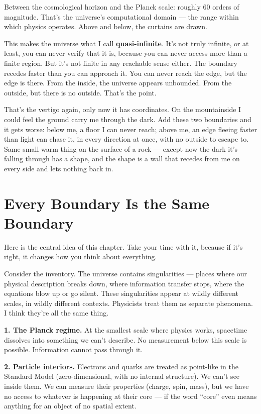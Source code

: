 \documentclass[11pt, twoside, openright]{book}
\begin{document}
Between the cosmological horizon and the Planck scale: roughly 60 orders of magnitude. That's the universe's computational domain --- the range within which physics operates. Above and below, the curtains are drawn.

This makes the universe what I call \textbf{quasi-infinite}. It's not truly infinite, or at least, you can never verify that it is, because you can never access more than a finite region. But it's not finite in any reachable sense either. The boundary recedes faster than you can approach it. You can never reach the edge, but the edge is there. From the inside, the universe appears unbounded. From the outside, but there is no outside. That's the point.

That's the vertigo again, only now it has coordinates. On the mountainside I could feel the ground carry me through the dark. Add these two boundaries and it gets worse: below me, a floor I can never reach; above me, an edge fleeing faster than light can chase it, in every direction at once, with no outside to escape to. Same small warm thing on the surface of a rock --- except now the dark it's falling through has a shape, and the shape is a wall that recedes from me on every side and lets nothing back in.


\section*{Every Boundary Is the Same Boundary}

Here is the central idea of this chapter. Take your time with it, because if it's right, it changes how you think about everything.

Consider the inventory. The universe contains singularities --- places where our physical description breaks down, where information transfer stops, where the equations blow up or go silent. These singularities appear at wildly different scales, in wildly different contexts. Physicists treat them as separate phenomena. I think they're all the same thing.

\textbf{1. The Planck regime.} At the smallest scale where physics works, spacetime dissolves into something we can't describe. No measurement below this scale is possible. Information cannot pass through it.

\textbf{2. Particle interiors.} Electrons and quarks are treated as point-like in the Standard Model (zero-dimensional, with no internal structure). We can't see inside them. We can measure their properties (charge, spin, mass), but we have no access to whatever is happening at their core --- if the word ``core'' even means anything for an object of no spatial extent.
\end{document}
